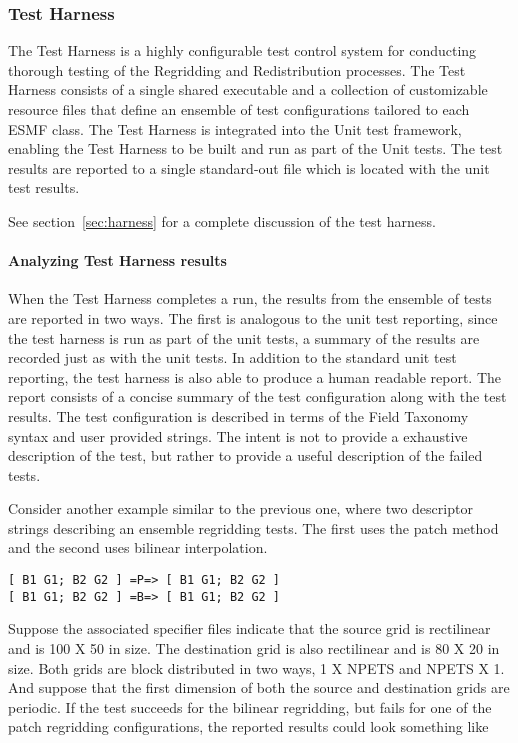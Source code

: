 \subsubsection{Test Harness}
The Test Harness is a highly configurable test control system for conducting 
thorough testing of the Regridding and Redistribution processes. The Test Harness 
consists of a single shared executable and a collection of customizable resource
files that define an ensemble of test configurations tailored to each ESMF class.
The Test Harness is integrated into the Unit test framework, enabling
the Test Harness to be built and run as part of the Unit tests. The test results 
are reported to a single standard-out file which is located with the unit test 
results.

See section~\ref{sec:harness} for a complete discussion of the test harness.


\paragraph{Analyzing Test Harness results }
When the Test Harness completes a run, the results from the ensemble of tests are
reported in two ways. The first is analogous to the unit test reporting, since the
test harness is run as part of the unit tests, a summary of the results are recorded 
just as with the unit tests. In addition to the standard unit test reporting, the
test harness is also able to produce a human readable report. The report consists 
of a concise summary of the test configuration along with the test results. The test 
configuration is described in terms of the Field Taxonomy syntax and user provided 
strings. The intent is not to provide a exhaustive description of the test, but 
rather to provide a useful description of the failed tests.

Consider another example similar to the previous one, where two descriptor strings 
describing an ensemble regridding tests. The first uses the patch method and the 
second uses bilinear interpolation.

\begin{center}
\begin{verbatim}
[ B1 G1; B2 G2 ] =P=> [ B1 G1; B2 G2 ] 
[ B1 G1; B2 G2 ] =B=> [ B1 G1; B2 G2 ] 
\end{verbatim}
\end{center}

Suppose the associated specifier files indicate that the source  grid is rectilinear
and is 100 X 50 in size. The destination grid is also rectilinear and is 80 X 20 
in size. 
Both grids are block distributed in two 
ways, 1 X NPETS and NPETS X 1. And suppose that the first dimension of both the
source and destination grids are periodic. If the test succeeds for the bilinear
regridding, but fails for one of the patch regridding configurations, the reported results
could look something like

